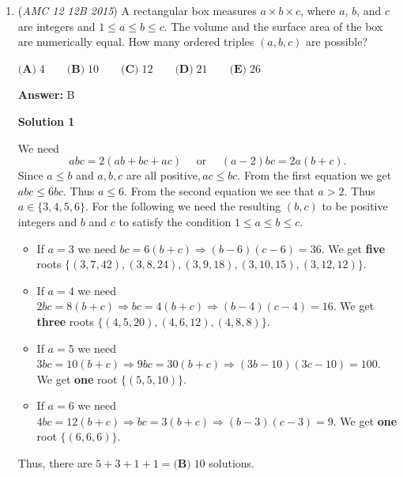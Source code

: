 \begin{enumerate}
 Look back at all our cases. Sum them up to get $1+2+7+7+3 = 20$

 iron

 


	\item (\textit{AMC 12 12B 2015}) A rectangular box measures $a \times b \times c$, where $a$, $b$, and $c$ are integers and $1\leq a \leq b \leq c$. The volume and the surface area of the box are numerically equal. How many ordered triples $(a,b,c)$ are possible?


 $\textbf{(A)}\; 4 \qquad\textbf{(B)}\; 10 \qquad\textbf{(C)}\; 12 \qquad\textbf{(D)}\; 21 \qquad\textbf{(E)}\; 26$

 \textbf{Answer: }B



\textbf{Solution 1}

We need 
 \[abc = 2(ab+bc+ac) \quad \text{ or } \quad (a-2)bc = 2a(b+c).\]Since $a\le b$ and $a,b,c$ are all positive$,ac \le bc$. From the first equation we get $abc \le 6bc$. Thus $a\le 6$. From the second equation we see that $a > 2$. Thus $a\in \{3, 4, 5, 6\}$. For the following we need the resulting $(b,c)$ to be positive integers and $b$ and $c$ to satisfy the condition $1\leq a \leq b \leq c.$

            \begin{itemize}
        \item If $a=3$ we need $bc = 6(b+c) \Rightarrow (b-6)(c-6)=36$. We get \textbf{five} roots $\{(3, 7, 42), (3, 8, 24), (3,9,18), (3, 10, 15), (3,12,12)\}$.
            \end{itemize}
            
            \begin{itemize}
        \item If $a=4$ we need $2bc = 8(b+c) \Rightarrow bc = 4(b+c) \Rightarrow (b-4)(c-4)=16$. We get \textbf{three} roots $\{(4,5,20), (4,6,12), (4,8,8)\}$.
            \end{itemize}
            
            \begin{itemize}
        \item If $a=5$ we need $3bc = 10(b+c) \Rightarrow 9bc=30(b+c) \Rightarrow (3b-10)(3c-10)=100$. We get \textbf{one} root $\{(5,5,10)\}$.
            \end{itemize}
            
            \begin{itemize}
        \item If $a=6$ we need $4bc = 12(b+c) \Rightarrow bc = 3(b+c) \Rightarrow (b-3)(c-3)=9$. We get \textbf{ one} root $\{(6,6,6)\}$.
            \end{itemize}
            Thus, there are $5+3+1+1 = \boxed{\textbf{(B)}\; 10}$ solutions.


\end{enumerate}
